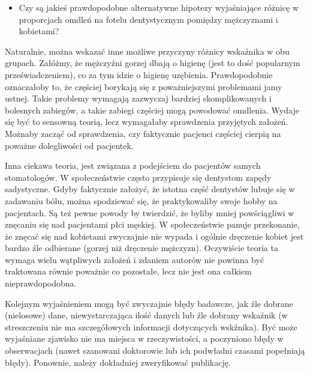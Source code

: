 \documentclass[11pt]{article}   %
\begin{document}
\begin{itemize}
	\item Czy są jakieś prawdopodobne alternatywne hipotezy wyjaśniające różnicę w proporcjach
	omdleń na fotelu dentystycznym pomiędzy mężczyznami i kobietami?
\end{itemize}
\par Naturalnie, można wskazać inne możliwe przyczyny różnicy wska\'znika w obu grupach. Załóżmy, że mężczy\'zni gorzej dbają o higienę (jest to dość popularnym przeświadczeniem), co za tym idzie o higienę uzębienia. Prawdopodobnie oznaczałoby to, że częściej borykają się z poważniejszymi problemami jamy ustnej. Takie problemy wymagają zazwyczaj bardziej skomplikowanych i bolesnych zabiegów, a takie zabiegi częściej mogą powodować omdlenia. Wydaje się być to sensowną teorią, lecz wymagałaby sprawdzenia przyjętych założeń. Możnaby zacząć od sprawdzenia, czy faktycznie pacjenci częściej cierpią na poważne dolegliwości od pacjentek.
\par Inna ciekawa teoria, jest związana z podejściem do pacjentów samych stomatologów. W społeczeństwie często przypisuje się dentystom zapędy sadystyczne. Gdyby faktycznie założyć, że istotna część dentystów lubuje się w zadawaniu bólu, można spodziewać się, że praktykowaliby swoje hobby na pacjentach. Są też pewne powody by twierdzić, że byliby mniej powściągliwi w znęcaniu się nad pacjentami płci męskiej. W społeczeństwie panuje przekonanie, że znęcać się nad kobietami zwyczajnie nie wypada i ogólnie dręczenie kobiet jest bardzo \'zle odbierane (gorzej niż dręczenie mężczyzn). Oczywiście teoria ta wymaga wielu wątpliwych założeń i zdaniem autorów nie powinna być traktowana równie poważnie co pozostałe, lecz nie jest ona całkiem nieprawdopodobna. 
\par Kolejnym wyjaśnieniem mogą być zwyczajnie błędy badawcze, jak \'zle dobrane (nielosowe) dane, niewystarczająca ilość danych lub \'zle dobrany wska\'znik (w streszczeniu nie ma szczegółowych informacji dotyczących wsk\'znika). Być może wyjaśniane zjawisko nie ma miejsca w rzeczywistości, a poczyniono błędy w obserwacjach (nawet szanowani doktorowie lub ich podwładni czasami popełniają błędy). Ponownie, należy dokładniej zweryfikować publikację.
\end{document}

